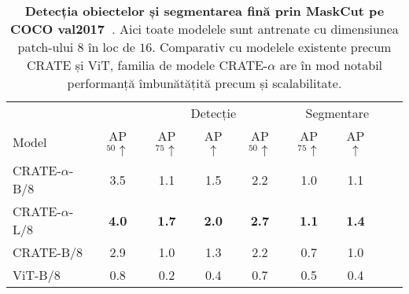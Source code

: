 \documentclass[../../book-main_ro.tex]{subfiles}
\begin{document}
\begin{table}[b]
    \centering
    \begin{tabular}{@{}lcccccccc@{}}
    \toprule
     &  & \multicolumn{3}{c}{Detecție} &  \multicolumn{3}{c}{Segmentare} \\ 
    Model & AP$_{50} \uparrow $ & AP$_{75} \uparrow $ & AP $\uparrow$ & AP$_{50} \uparrow$ & AP$_{75} \uparrow $ & AP $\uparrow$ \\ 
    \midrule
    \midrule
    CRATE-\(\alpha\)-B/8 & 3.5 & 1.1 & 1.5 & 2.2 & 1.0 & 1.1 \\
    CRATE-\(\alpha\)-L/8 & \textbf{4.0} & \textbf{1.7} & \textbf{2.0} & \textbf{2.7} & \textbf{1.1} & \textbf{1.4} \\
    \midrule
    \color{gray}CRATE-B/8 & \color{gray}2.9 & \color{gray}1.0 & \color{gray}1.3 & \color{gray}2.2 & \color{gray}0.7 & \color{gray}1.0 \\
    \color{gray}ViT-B/8 & \color{gray}0.8 & \color{gray}0.2 & \color{gray}0.4 & \color{gray}0.7 & \color{gray}0.5 & \color{gray}0.4 \\
    \bottomrule
    \end{tabular}
    \caption{\small \textbf{Detecția obiectelor și segmentarea fină prin MaskCut pe COCO val2017~\citep{lin2014microsoft}}. Aici toate modelele sunt antrenate cu dimensiunea patch-ului \(8\) în loc de \(16\). Comparativ cu modelele existente precum CRATE și ViT, familia de modele CRATE-\(\alpha\) are în mod notabil performanță îmbunătățită precum și scalabilitate.}
    \label{tab:crate_alpha_detection_segmentation}
\end{table}
\end{document}
